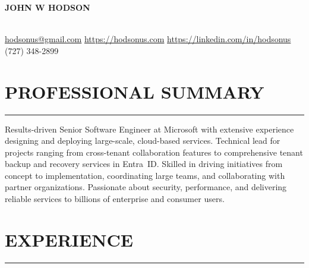 \documentclass[11pt]{article}
\begin{document}
\noindent
\centerline{\huge \textbf{JOHN W HODSON}}\\[14pt] %
\vspace{0.2cm}
\href{mailto:hodsonus@gmail.com}{hodsonus@gmail.com} \hfill\href{https://hodsonus.com}{https://hodsonus.com} \hfill\href{https://linkedin.com/in/hodsonus}{https://linkedin.com/in/hodsonus} \hfill{(727) 348-2899}

\vspace{0.6cm}
\section*{PROFESSIONAL SUMMARY}
\hrule
\vspace{0.3cm}
\noindent
Results-driven Senior Software Engineer at Microsoft with extensive experience designing and deploying large-scale, cloud-based services. Technical lead for projects ranging from cross-tenant collaboration features to comprehensive tenant backup and recovery services in Entra~ID. Skilled in driving initiatives from concept to implementation, coordinating large teams, and collaborating with partner organizations. Passionate about security, performance, and delivering reliable services to billions of enterprise and consumer users.

\vspace{0.6cm}
\section*{EXPERIENCE}
\hrule
\vspace{0.3cm}
\end{document}
